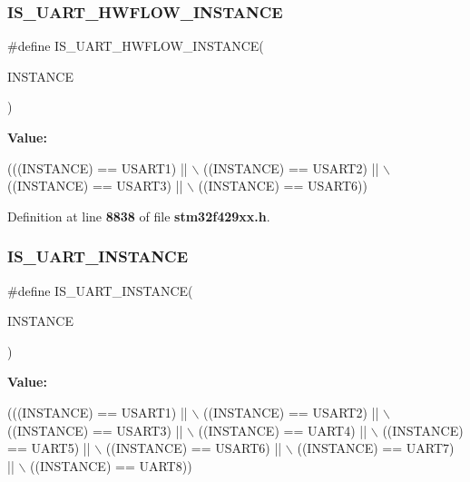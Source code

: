 \subsubsection{I\+S\+\_\+\+U\+A\+R\+T\+\_\+\+H\+W\+F\+L\+O\+W\+\_\+\+I\+N\+S\+T\+A\+N\+CE}
{\footnotesize\ttfamily \#define I\+S\+\_\+\+U\+A\+R\+T\+\_\+\+H\+W\+F\+L\+O\+W\+\_\+\+I\+N\+S\+T\+A\+N\+CE(\begin{DoxyParamCaption}\item[{}]{I\+N\+S\+T\+A\+N\+CE }\end{DoxyParamCaption})}

{\bfseries Value\+:}
\begin{DoxyCode}
(((INSTANCE) == USART1) || \(\backslash\)
                                           ((INSTANCE) == USART2) || \(\backslash\)
                                           ((INSTANCE) == USART3) || \(\backslash\)
                                           ((INSTANCE) == USART6))
\end{DoxyCode}


Definition at line \textbf{ 8838} of file \textbf{ stm32f429xx.\+h}.

\mbox{\label{group__Exported__macros_gacbd2efab4cd39d4867c4dbeacb87e84b}} 
\subsubsection{I\+S\+\_\+\+U\+A\+R\+T\+\_\+\+I\+N\+S\+T\+A\+N\+CE}
{\footnotesize\ttfamily \#define I\+S\+\_\+\+U\+A\+R\+T\+\_\+\+I\+N\+S\+T\+A\+N\+CE(\begin{DoxyParamCaption}\item[{}]{I\+N\+S\+T\+A\+N\+CE }\end{DoxyParamCaption})}

{\bfseries Value\+:}
\begin{DoxyCode}
(((INSTANCE) == USART1) || \(\backslash\)
                                    ((INSTANCE) == USART2) || \(\backslash\)
                                    ((INSTANCE) == USART3) || \(\backslash\)
                                    ((INSTANCE) == UART4)  || \(\backslash\)
                                    ((INSTANCE) == UART5)  || \(\backslash\)
                                    ((INSTANCE) == USART6) || \(\backslash\)
                                    ((INSTANCE) == UART7)  || \(\backslash\)
                                    ((INSTANCE) == UART8))
\end{DoxyCode}


